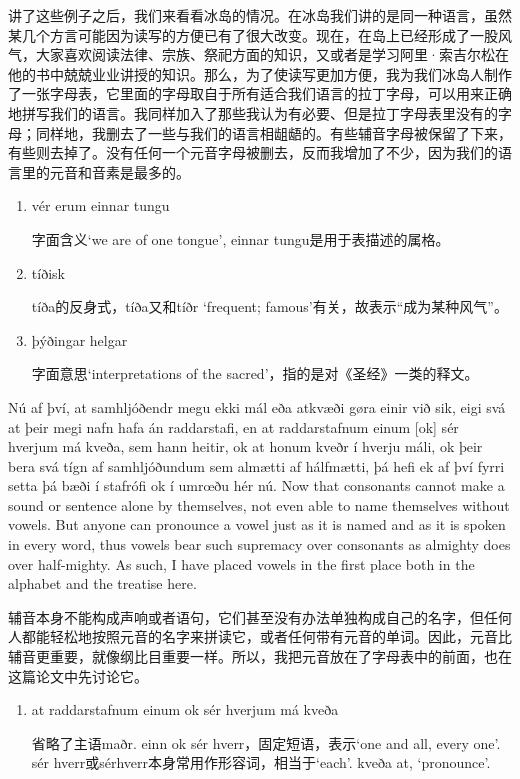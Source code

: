 \begin{translation*}{}
  讲了这些例子之后，我们来看看冰岛的情况。在冰岛我们讲的是同一种语言，虽然某几个方言可能因为读写的方便已有了很大改变。现在，在岛上已经形成了一股风气，大家喜欢阅读法律、宗族、祭祀方面的知识，又或者是学习阿里·索吉尔松在他的书中兢兢业业讲授的知识。那么，为了使读写更加方便，我为我们冰岛人制作了一张字母表，它里面的字母取自于所有适合我们语言的拉丁字母，可以用来正确地拼写我们的语言。我同样加入了那些我认为有必要、但是拉丁字母表里没有的字母；同样地，我删去了一些与我们的语言相龃龉的。有些辅音字母被保留了下来，有些则去掉了。没有任何一个元音字母被删去，反而我增加了不少，因为我们的语言里的元音和音素是最多的。
\end{translation*}
\begin{grammar*}{}
  \begin{enumerate}[leftmargin=*]
    \item vér erum einnar tungu

          字面含义`we are of one tongue', einnar tungu是用于表描述的属格。

    \item tíðisk

          tíða的反身式，tíða又和tíðr `frequent; famous'有关，故表示“成为某种风气”。

    \item þýðingar helgar

          字面意思`interpretations of the sacred'，指的是对《圣经》一类的释文。
  \end{enumerate}
\end{grammar*}
\begin{paracol}{2}
  Nú af því, at samhljóðendr megu ekki mál eða atkvæði gøra einir við sik, eigi svá at þeir megi nafn hafa án raddarstafi, en at raddarstafnum einum [ok] sér hverjum má kveða, sem hann heitir, ok at honum kveðr í hverju máli, ok þeir bera svá tígn af samhljóðundum sem almætti af hálfmætti, þá hefi ek af því fyrri setta þá bæði í stafrófi ok í umrœðu hér nú.
  \switchcolumn
  Now that consonants cannot make a sound or sentence alone by themselves, not even able to name themselves without vowels. But anyone can pronounce a vowel just as it is named and as it is spoken in every word, thus vowels bear such supremacy over consonants as almighty does over half-mighty. As such, I have placed vowels in the first place both in the alphabet and the treatise here.
\end{paracol}
\begin{translation*}{}
  辅音本身不能构成声响或者语句，它们甚至没有办法单独构成自己的名字，但任何人都能轻松地按照元音的名字来拼读它，或者任何带有元音的单词。因此，元音比辅音更重要，就像纲比目重要一样。所以，我把元音放在了字母表中的前面，也在这篇论文中先讨论它。
\end{translation*}
\begin{grammar*}{}
  \begin{enumerate}[leftmargin=*]
    \item at raddarstafnum einum ok sér hverjum má kveða

          省略了主语maðr. einn ok sér hverr，固定短语，表示`one and all, every one'. sér hverr或sérhverr本身常用作形容词，相当于`each'. kveða at, `pronounce'.
  \end{enumerate}
\end{grammar*}
